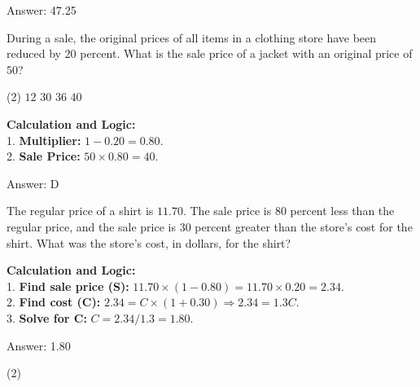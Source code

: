 \documentclass[11pt,paper=a4,answers]{exam}
\begin{document}
\begin{questions}
\begin{solution}
\vspace{30pt}

Answer: \colorbox{yellow!100}{47.25}
\end{solution}

\vspace{60pt}

\question
During a sale, the original prices of all items in a clothing store have been reduced by 20 percent. What is the sale price of a jacket with an original price of $50$?
\begin{tasks}(2)
    \task $12$
    \task $30$
    \task $36$
    \task $40$
\end{tasks}

\begin{solution}
\textbf{Calculation and Logic:} \\
1. \textbf{Multiplier:} $1 - 0.20 = 0.80$. \\
2. \textbf{Sale Price:} $50 \times 0.80 = 40$.

\vspace{30pt}

Answer: \colorbox{yellow!100}{D}
\end{solution}

\vspace{60pt}

\question
The regular price of a shirt is $11.70$. The sale price is 80 percent less than the regular price, and the sale price is 30 percent greater than the store's cost for the shirt. What was the store's cost, in dollars, for the shirt?

\begin{solution}
\textbf{Calculation and Logic:} \\
1. \textbf{Find sale price (S):} $11.70 \times (1 - 0.80) = 11.70 \times 0.20 = 2.34$. \\
2. \textbf{Find cost (C):} $2.34 = C \times (1 + 0.30) \Rightarrow 2.34 = 1.3C$. \\
3. \textbf{Solve for C:} $C = 2.34 / 1.3 = 1.80$.

\vspace{30pt}

Answer: \colorbox{yellow!100}{1.80}
\end{solution}

\vspace{60pt}

\begin{tasks}(2)
\end{tasks}


\end{questions}
\end{document}
